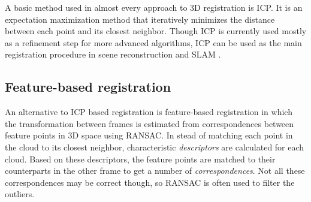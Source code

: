 \documentclass[a4paper]{article}
\begin{document}
A basic method used in almost every approach to 3D registration is \ac{ICP}\cite{besl1992method}. It is an expectation maximization method that iteratively minimizes the distance between each point and its closest neighbor. Though \ac{ICP} is currently used mostly as a refinement step for more advanced algorithms, \ac{ICP} can be used as the main registration procedure in scene reconstruction \cite{izadi2011kinectfusion,newcombe2011kinectfusion} and \ac{SLAM} \cite{nuchter20076d}.




\subsection{Feature-based registration}

An alternative to \ac{ICP} based registration is feature-based registration in which the transformation between frames is estimated from correspondences between feature points in 3D space using \ac{RANSAC}. In stead of matching each point in the cloud to its closest neighbor, characteristic \emph{descriptors} are calculated for each cloud. Based on these descriptors, the feature points are matched to their counterparts in the other frame to get a number of \emph{correspondences}. Not all these correspondences may be correct though, so \ac{RANSAC} is often used to filter the outliers. 
\end{document}
